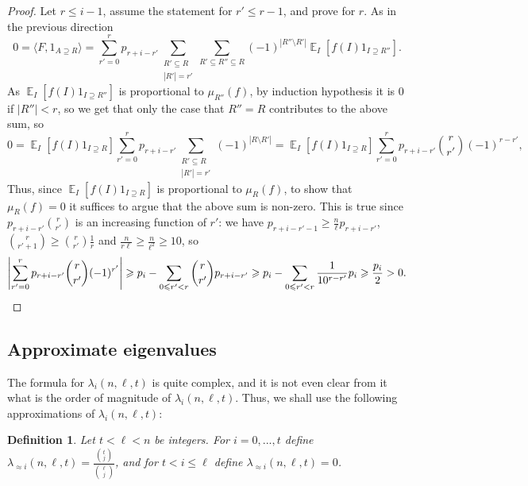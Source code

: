 \documentclass[11pt]{article}
\newtheorem{definition}[theorem]{Definition}
\newcommand\card[1]{\left| {#1} \right|}
\newcommand\Expect[2]{{\mathop{\mathbb{E}}_{#1}\left[ {#2} \right]}}
\newcommand\inner[2]{\langle{#1},{#2}\rangle}
\renewcommand\geq{\geqslant}
\renewcommand\leq{\leqslant}
\begin{document}
\begin{proof}
Let $r\leq i-1$, assume the statement for $r'\leq r-1$, and prove for $r$. As in the previous direction
\[
0 =
\inner{F}{1_{A\supseteq R}}
=
\sum\limits_{r'=0}^{r}p_{r+i-r'}\sum\limits_{\substack{R'\subseteq R\\ \card{R'} = r'}}\sum\limits_{R'\subseteq R''\subseteq R} (-1)^{\card{R''\setminus R'}} \Expect{I}{f(I) 1_{I\supseteq R''}}.
\]
As $\Expect{I}{f(I) 1_{I\supseteq R''}}$ is proportional to $\mu_{R''}(f)$, by induction hypothesis it is $0$ if $\card{R''}<r$, so we get that only
the case that $R'' = R$ contributes to the above sum, so
\[
0
= \Expect{I}{f(I) 1_{I\supseteq R}} \sum\limits_{r'=0}^{r}p_{r+i-r'}\sum\limits_{\substack{R'\subseteq R\\ \card{R'} = r'}}(-1)^{\card{R\setminus R'}}
= \Expect{I}{f(I) 1_{I\supseteq R}} \sum\limits_{r'=0}^{r}p_{r+i-r'}\binom{r}{r'}(-1)^{r-r'},
\]
Thus, since $\Expect{I}{f(I) 1_{I\supseteq R}}$ is proportional to $\mu_R(f)$, to show that $\mu_R(f) = 0$ it suffices to argue that the above sum is non-zero.
This is true since $p_{r+i-r'}\binom{r}{r'}$ is an increasing function of $r'$: we have $p_{r+i-r'-1}\geq \frac{n}{\ell} p_{r+i-r'}$,
$\binom{r}{r'+1}\geq \binom{r}{r'} \frac{1}{r}$ and $\frac{n}{r\ell} \geq \frac{n}{\ell^2}\geq 10$, so
\[
\card{\sum\limits_{r'=0}^{r}p_{r+i-r'}\binom{r}{r'}(-1)^{r'}}
\geq p_i - \sum\limits_{0\leq r'<r} \binom{r}{r'}p_{r+i-r'}
\geq p_i - \sum\limits_{0\leq r'<r} \frac{1}{10^{r-r'}}p_i
\geq \frac{p_i}{2} > 0.\qedhere      %
\]
\end{proof}




\subsection{Approximate eigenvalues}
The formula for $\lambda_i(n,\ell,t)$ is quite complex, and it is not even clear from it what is
the order of magnitude of $\lambda_i(n,\ell,t)$.
Thus, we shall use the following approximations of $\lambda_i(n,\ell,t)$:
\begin{definition}
Let $t<\ell<n$ be integers. For $i=0,...,t$ define $\lambda_{\approx i}(n,\ell,t) = \frac{{t\choose j}}{{\ell\choose j}}$,
and for $t<i\leq \ell$ define $\lambda_{\approx i}(n,\ell,t) = 0$.
\end{definition}
\end{document}
